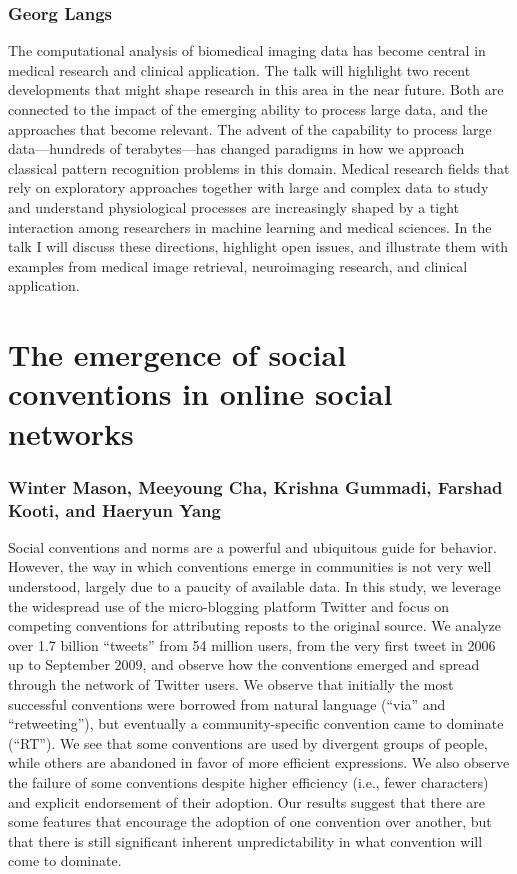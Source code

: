 \documentclass[10pt,letterpaper]{article}
\begin{document}
\subsubsection{Georg Langs}

The computational analysis of biomedical imaging data has become central in
medical research and clinical application. The talk will highlight two recent
developments that might shape research in this area in the near future. Both are
connected to the impact of the emerging ability to process large data, and the
approaches that become relevant. The advent of the capability to process large
data---hundreds of terabytes---has changed paradigms in how we approach classical
pattern recognition problems in this domain. Medical research fields that rely on
exploratory approaches together with large and complex data to study and
understand physiological processes are increasingly shaped by a tight interaction
among researchers in machine learning and medical sciences. In the talk I will
discuss these directions, highlight open issues, and illustrate them
with examples from medical image retrieval, neuroimaging research, and
clinical application.

\section{The emergence of social conventions in online social networks}
\subsubsection{Winter Mason, Meeyoung Cha, Krishna Gummadi, Farshad Kooti, and Haeryun Yang}

Social conventions and norms are a powerful and ubiquitous guide for behavior.
However, the way in which conventions emerge in communities is not very well
understood, largely due to a paucity of available data.  In this study, we
leverage the widespread use of the micro-blogging platform Twitter and focus on
competing conventions for attributing reposts to the original source.  We analyze
over 1.7 billion ``tweets'' from 54 million users, from the very first tweet in
2006 up to September 2009, and observe how the conventions emerged and spread
through the network of Twitter users.  We observe that initially the most
successful conventions were borrowed from natural language (``via'' and
``retweeting''), but eventually a community-specific convention came to dominate
(``RT'').  We see that some conventions are used by divergent groups of people,
while others are abandoned in favor of more efficient expressions.  We also
observe the failure of some conventions despite higher efficiency (i.e., fewer
characters) and explicit endorsement of their adoption.  Our results suggest that
there are some features that encourage the adoption of one convention over
another, but that there is still significant inherent unpredictability in what
convention will come to dominate.
\end{document}
